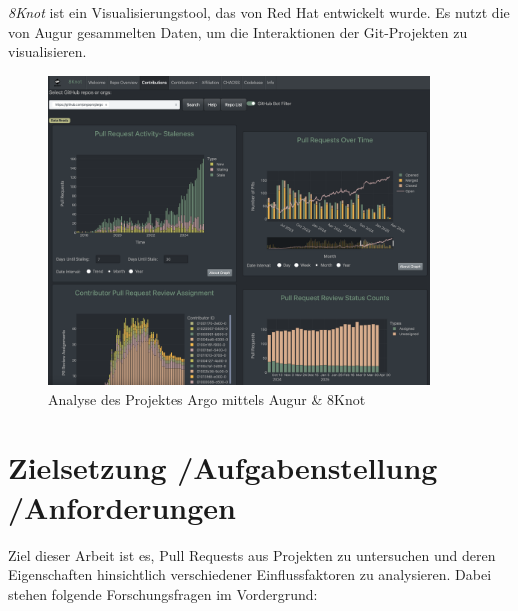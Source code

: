 \textit{8Knot} ist ein Visualisierungstool, das von Red Hat entwickelt wurde. Es nutzt die von Augur gesammelten Daten, um die Interaktionen der Git-Projekten zu visualisieren.
\begin{figure}[htbp]
    \centering
    \includegraphics[width=0.9\textwidth]{Figures/augur-8knot.png}
    \caption{Analyse des Projektes Argo mittels Augur \& 8Knot}
    \label{fig:augur-8knot}
\end{figure}

\newpage


\section{Zielsetzung /\allowbreak Aufgabenstellung /\allowbreak Anforderungen}
\label{sec:Zielsetzung}

Ziel dieser Arbeit ist es, Pull Requests aus Projekten zu untersuchen und deren Eigenschaften hinsichtlich verschiedener Einflussfaktoren zu analysieren. Dabei stehen folgende Forschungsfragen im Vordergrund:



